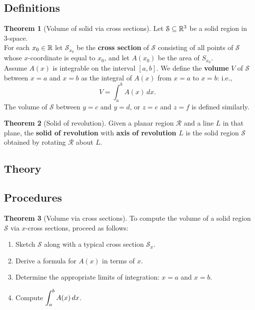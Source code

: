 \documentclass[11pt]{article}
\theoremstyle{definition}
\theoremstyle{named}
\newtheorem*{namedtheorem}{Theorem}
\numberwithin{myalgctr}{section}
\begin{document}
\thispagestyle{fancy}
\subsection*{Definitions}
\begin{namedtheorem}[Volume of solid via cross sections] Let $\mathcal{S}\subseteq {\mathbb R}^3$ be a solid region in $3$-space.
\vspace{.1in}
\\
For each $x_0\in {\mathbb R}$ let $\mathcal{S}_{x_0}$ be the {\bf cross section}  of $\mathcal{S}$ consisting of all points of $\mathcal{S}$ whose $x$-coordinate is equal to $x_0$, and let $A(x_0)$ be the area of $S_{x_0}$.
\vspace{.1in}
\\
Assume $A(x)$ is integrable on the interval $[a,b]$. We define the {\bf volume} $V$ of $\mathcal{S}$ between $x=a$ and $x=b$ as the integral of $A(x)$ from $x=a$ to $x=b$: i.e.,
\[
V=\int_a^b A(x)\, dx.
\]
The volume of $\mathcal{S}$ between $y=c$ and $y=d$, or $z=e$ and $z=f$ is defined similarly.
 \end{namedtheorem}

\begin{namedtheorem}[Solid of revolution] Given a planar region $\mathcal{R}$ and a line $L$ in that plane, the {\bf solid of revolution} with {\bf axis of revolution $L$} is the solid region $\mathcal{S}$ obtained by rotating $\mathcal{R}$ about $L$.
\end{namedtheorem}


 \subsection*{Theory}




\subsection*{Procedures}
\begin{namedtheorem}[Volume via cross sections] To compute the volume of a solid region $\mathcal{S}$ via $x$-cross sections, proceed as follows:
\begin{enumerate}
  \item Sketch $\mathcal{S}$ along with a typical cross section $\mathcal{S}_x$.
  \item Derive a formula for $A(x)$ in terms of $x$.
  \item Determine the appropriate limits of integration: $x=a$ and $x=b$.
  \item Compute $\displaystyle \int_a^b A(x)\, dx$.
\end{enumerate}

\end{namedtheorem}
\end{document}
